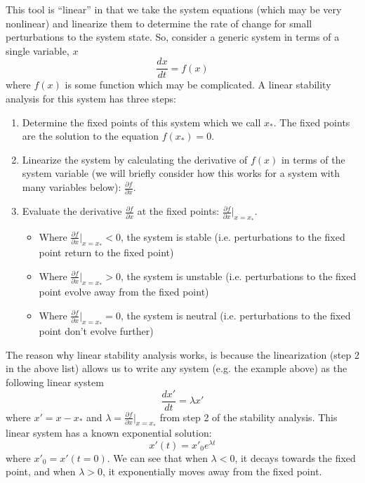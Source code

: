 \documentclass[12pt]{article}
\theoremstyle{definition}
\newcommand{\pd}[2]{\frac{\partial {#1}}{\partial {#2}}}
\begin{document}
This tool is ``linear'' in that we take the system equations (which may be very nonlinear) and linearize them to determine the rate of change for small perturbations to the system state. So, consider a generic system in terms of a single variable, $x$
\begin{equation}
\frac{dx}{dt} = f(x)
\end{equation}
where $f(x)$ is some function which may be complicated. A linear stability analysis for this system has three steps:
\begin{enumerate}
\item Determine the fixed points of this system which we call $x_*$. The fixed points are the solution to the equation $f(x_*)=0$.
\item Linearize the system by calculating the derivative of $f(x)$ in terms of the system variable (we will briefly consider how this works for a system with many variables below): $\pd{f}{x}$.
\item Evaluate the derivative $\pd{f}{x}$ at the fixed points: $\pd{f}{x}|_{x=x_*}$. 
\begin{itemize}
\item Where $\pd{f}{x}|_{x=x_*}<0$, the system is stable (i.e. perturbations to the fixed point return to the fixed point)
\item Where $\pd{f}{x}|_{x=x_*}>0$, the system is unstable (i.e. perturbations to the fixed point evolve away from the fixed point)
\item Where $\pd{f}{x}|_{x=x_*}=0$, the system is neutral (i.e. perturbations to the fixed point don't evolve further)
\end{itemize}
\end{enumerate}

The reason why linear stability analysis works, is because the linearization (step 2 in the above list) allows us to write any system (e.g. the example above) as the following linear system
\begin{equation}
\frac{dx'}{dt} = \lambda x'
\end{equation}
where $x' = x-x_*$ and $\lambda = \pd{f}{x}|_{x=x_*}$ from step 2 of the stability analysis. This linear system has a known exponential solution:
\begin{equation}
x'(t) = x'_0 e^{\lambda t}
\end{equation}
where $x'_0 = x'(t=0)$. We can see that when $\lambda<0$, it decays towards the fixed point, and when $\lambda>0$, it exponentially moves away from the fixed point.
\end{document}
